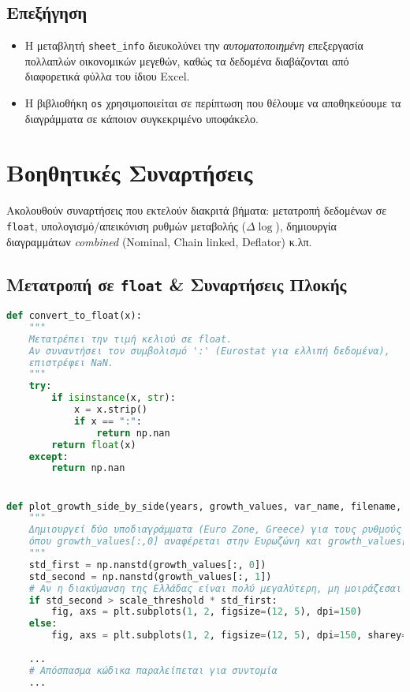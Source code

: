 \documentclass{book}
\begin{document}
\subsection*{Επεξήγηση}
\begin{itemize}
    \item Η μεταβλητή \texttt{sheet\_info} διευκολύνει την \emph{αυτοματοποιημένη} επεξεργασία πολλαπλών οικονομικών μεγεθών, καθώς τα δεδομένα διαβάζονται από διαφορετικά φύλλα του ίδιου Excel.
    \item Η βιβλιοθήκη \texttt{os} χρησιμοποιείται σε περίπτωση που θέλουμε να αποθηκεύουμε τα διαγράμματα σε κάποιον συγκεκριμένο υποφάκελο.

\end{itemize}

\section{Βοηθητικές Συναρτήσεις}
Ακολουθούν συναρτήσεις που εκτελούν διακριτά βήματα: μετατροπή δεδομένων σε \texttt{float}, υπολογισμό/απεικόνιση ρυθμών μεταβολής (\(\Delta \log\)), δημιουργία διαγραμμάτων \emph{combined} (Nominal, Chain linked, Deflator) κ.λπ.

\subsection{Μετατροπή σε \texttt{float} \& Συναρτήσεις Πλοκής}
\begin{tcolorbox}[colback=white,colframe=black,title=convert\_to\_float \& Συναρτήσεις Διαγραμμάτων (Side by Side / Combined)]
\begin{lstlisting}[language=Python]
def convert_to_float(x):
    """
    Μετατρέπει την τιμή κελιού σε float.
    Αν συναντήσει τον συμβολισμό ':' (Eurostat για ελλιπή δεδομένα),
    επιστρέφει NaN.
    """
    try:
        if isinstance(x, str):
            x = x.strip()
            if x == ":":
                return np.nan
        return float(x)
    except:
        return np.nan


def plot_growth_side_by_side(years, growth_values, var_name, filename, scale_threshold=2):
    """
    Δημιουργεί δύο υποδιαγράμματα (Euro Zone, Greece) για τους ρυθμούς μεταβολής,
    όπου growth_values[:,0] αναφέρεται στην Ευρωζώνη και growth_values[:,1] στην Ελλάδα.
    """
    std_first = np.nanstd(growth_values[:, 0])
    std_second = np.nanstd(growth_values[:, 1])
    # Αν η διακύμανση της Ελλάδας είναι πολύ μεγαλύτερη, μη μοιράζεσαι το ίδιο y-axis.
    if std_second > scale_threshold * std_first:
        fig, axs = plt.subplots(1, 2, figsize=(12, 5), dpi=150)
    else:
        fig, axs = plt.subplots(1, 2, figsize=(12, 5), dpi=150, sharey=True)
    
    ...
    # Απόσπασμα κώδικα παραλείπεται για συντομία
    ...
\end{lstlisting}
\end{tcolorbox}
\end{document}
